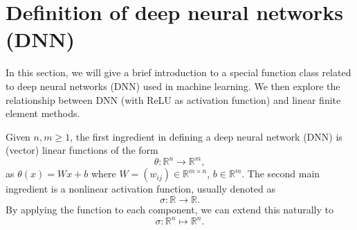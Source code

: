 \section{Definition of deep neural networks (DNN)} 
In this section, we will give a brief introduction to a special
function class related to deep neural networks (DNN) used in machine
learning.  We then explore the relationship between DNN (with ReLU as
activation function) and linear finite element methods. 

Given $n, m\ge 1$, the first ingredient in defining a deep neural
network (DNN) is (vector) linear functions of the form
\begin{equation}\label{thetamap1}
\theta:\mathbb{R}^{n}\to\mathbb{R}^{m} ,
\end{equation}as $\theta(x)=Wx+b$ where
$W=(w_{ij})\in\mathbb{R}^{m\times n}$, $b\in\mathbb{R}^{m}$. 
The second main ingredient is a nonlinear activation function, usually
denoted as 
\begin{equation}\label{sigma}
\sigma: \mathbb{R} \to \mathbb{R}.
\end{equation} 
By applying the function to each component, we can extend this
naturally to 
$$
\sigma:\mathbb R^{n}\mapsto \mathbb R^{n}.
$$


